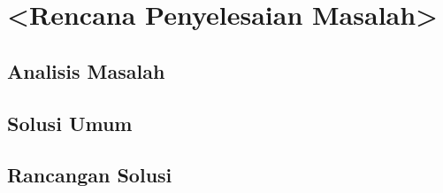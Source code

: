 \chapter{<Rencana Penyelesaian Masalah>}

\section{Analisis Masalah}
\blindtext

\section{Solusi Umum}
\blindtext

\section{Rancangan Solusi}
\blindtext